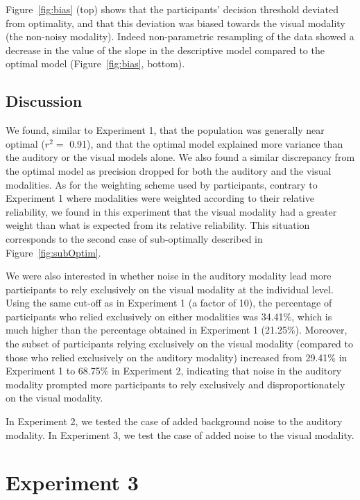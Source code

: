 \documentclass[english,man]{apa6}
\theoremstyle{definition}
\theoremstyle{definition}
\theoremstyle{definition}
\theoremstyle{remark}
\begin{document}
Figure~\ref{fig:bias} (top) shows that the participants' decision
threshold deviated from optimality, and that this deviation was biased
towards the visual modality (the non-noisy modality). Indeed
non-parametric resampling of the data showed a decrease in the value of
the slope in the descriptive model compared to the optimal model
(Figure~\ref{fig:bias}, bottom).

\subsection{Discussion}\label{discussion-1}

We found, similar to Experiment 1, that the population was generally
near optimal (\(r^2 =\) 0.91), and that the optimal model explained more
variance than the auditory or the visual models alone. We also found a
similar discrepancy from the optimal model as precision dropped for both
the auditory and the visual modalities. As for the weighting scheme used
by participants, contrary to Experiment 1 where modalities were weighted
according to their relative reliability, we found in this experiment
that the visual modality had a greater weight than what is expected from
its relative reliability. This situation corresponds to the second case
of sub-optimally described in Figure~\ref{fig:subOptim}.

We were also interested in whether noise in the auditory modality lead
more participants to rely exclusively on the visual modality at the
individual level. Using the same cut-off as in Experiment 1 (a factor of
10), the percentage of participants who relied exclusively on either
modalities was 34.41\%, which is much higher than the percentage
obtained in Experiment 1 (21.25\%). Moreover, the subset of participants
relying exclusively on the visual modality (compared to those who relied
exclusively on the auditory modality) increased from 29.41\% in
Experiment 1 to 68.75\% in Experiment 2, indicating that noise in the
auditory modality prompted more participants to rely exclusively and
disproportionately on the visual modality.

In Experiment 2, we tested the case of added background noise to the
auditory modality. In Experiment 3, we test the case of added noise to
the visual modality.

\section{Experiment 3}\label{experiment-3}
\end{document}
